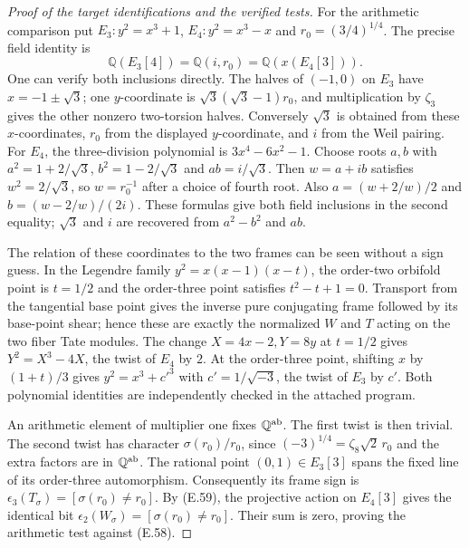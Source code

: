 \begin{proof}[Proof of the target identifications and the verified tests]
For the arithmetic comparison put
$E_3:y^2=x^3+1$, $E_4:y^2=x^3-x$ and
$r_0=(3/4)^{1/4}$.  The precise field identity is
\[
       \mathbb Q(E_3[4])=\mathbb Q(i,r_0)
                       =\mathbb Q(x(E_4[3])).             \tag{E.59}
\]
One can verify both inclusions directly.  The halves
of $(-1,0)$ on $E_3$ have $x=-1\pm\sqrt3$;
one $y$-coordinate is
$\sqrt3(\sqrt3-1)r_0$, and multiplication by
$\zeta_3$ gives the other nonzero two-torsion halves.
Conversely $\sqrt3$ is obtained from these
$x$-coordinates, $r_0$ from the displayed
$y$-coordinate, and $i$ from the Weil pairing.
For $E_4$, the three-division polynomial is
$3x^4-6x^2-1$.  Choose roots $a,b$ with
$a^2=1+2/\sqrt3$, $b^2=1-2/\sqrt3$ and
$ab=i/\sqrt3$.  Then $w=a+ib$ satisfies
$w^2=2/\sqrt3$, so $w=r_0^{-1}$ after a choice
of fourth root.  Also
$a=(w+2/w)/2$ and $b=(w-2/w)/(2i)$.
These formulas give both field inclusions in the
second equality; $\sqrt3$ and $i$ are recovered
from $a^2-b^2$ and $ab$.

The relation of these coordinates to the two frames
can be seen without a sign guess.  In the Legendre
family $y^2=x(x-1)(x-t)$, the order-two orbifold
point is $t=1/2$ and the order-three point satisfies
$t^2-t+1=0$.  Transport from the tangential base
point gives the inverse pure conjugating frame
followed by its base-point shear; hence these are
exactly the normalized $W$ and $T$ acting on the
two fiber Tate modules.  The change
$X=4x-2,Y=8y$ at $t=1/2$ gives
$Y^2=X^3-4X$, the twist of $E_4$ by $2$.
At the order-three point, shifting $x$ by
$(1+t)/3$ gives $y^2=x^3+c'^3$ with
$c'=1/\sqrt{-3}$, the twist of $E_3$ by $c'$.
Both polynomial identities are independently
checked in the attached program.

An arithmetic element of multiplier one fixes
$\mathbb Q^{\rm ab}$.  The first twist is then
trivial.  The second twist has character
$\sigma(r_0)/r_0$, since
$(-3)^{1/4}=\zeta_8\sqrt2\,r_0$ and the extra
factors are in $\mathbb Q^{\rm ab}$.
The rational point $(0,1)\in E_3[3]$ spans the
fixed line of its order-three automorphism.
Consequently its frame sign is
$\epsilon_3(T_\sigma)=[\sigma(r_0)\ne r_0]$.
By (E.59), the projective action on $E_4[3]$
gives the identical bit
$\epsilon_2(W_\sigma)=[\sigma(r_0)\ne r_0]$.
Their sum is zero, proving the arithmetic test
against (E.58).


\end{proof}
